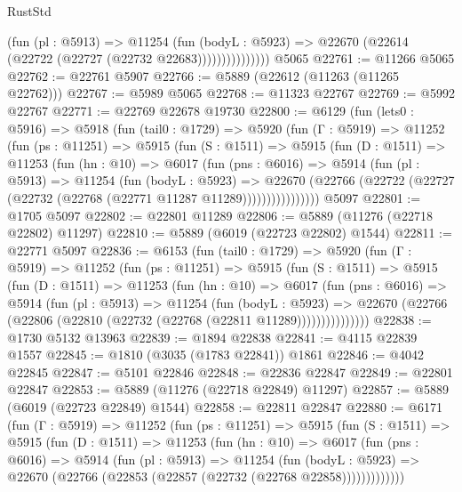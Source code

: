 \begin{lexlean}{RustStd}
\begin{coremodule}
                      (fun (pl : @5913) =>
                      @11254
                        (fun (bodyL : @5923) =>
                        @22670 (@22614 (@22722 (@22727 (@22732 @22683)))))))))))))))
    @5065
@22761 := @11266 @5065
@22762 := @22761 @5907
@22766 := @5889 (@22612 (@11263 (@11265 @22762)))
@22767 := @5989 @5065
@22768 := @11323 @22767
@22769 := @5992 @22767
@22771 := @22769 @22678 @19730
@22800 := @6129
    (fun (lets0 : @5916) =>
    @5918
      (fun (tail0 : @1729) =>
      @5920
        (fun (Γ : @5919) =>
        @11252
          (fun (ps : @11251) =>
          @5915
            (fun (S : @1511) =>
            @5915
              (fun (D : @1511) =>
              @11253
                (fun (hn : @10) =>
                @6017
                  (fun (pns : @6016) =>
                  @5914
                    (fun (pl : @5913) =>
                    @11254
                      (fun (bodyL : @5923) =>
                      @22670
                        (@22766
                          (@22722 (@22727 (@22732 (@22768 (@22771 @11287 @11289))))))))))))))))
    @5097
@22801 := @1705 @5097
@22802 := @22801 @11289
@22806 := @5889 (@11276 (@22718 @22802) @11297)
@22810 := @5889 (@6019 (@22723 @22802) @1544)
@22811 := @22771 @5097
@22836 := @6153
    (fun (tail0 : @1729) =>
    @5920
      (fun (Γ : @5919) =>
      @11252
        (fun (ps : @11251) =>
        @5915
          (fun (S : @1511) =>
          @5915
            (fun (D : @1511) =>
            @11253
              (fun (hn : @10) =>
              @6017
                (fun (pns : @6016) =>
                @5914
                  (fun (pl : @5913) =>
                  @11254
                    (fun (bodyL : @5923) =>
                    @22670 (@22766 (@22806 (@22810 (@22732 (@22768 (@22811 @11289)))))))))))))))
@22838 := @1730 @5132 @13963
@22839 := @1894 @22838
@22841 := @4115 @22839 @1557
@22845 := @1810 (@3035 (@1783 @22841)) @1861
@22846 := @4042 @22845
@22847 := @5101 @22846
@22848 := @22836 @22847
@22849 := @22801 @22847
@22853 := @5889 (@11276 (@22718 @22849) @11297)
@22857 := @5889 (@6019 (@22723 @22849) @1544)
@22858 := @22811 @22847
@22880 := @6171
    (fun (Γ : @5919) =>
    @11252
      (fun (ps : @11251) =>
      @5915
        (fun (S : @1511) =>
        @5915
          (fun (D : @1511) =>
          @11253
            (fun (hn : @10) =>
            @6017
              (fun (pns : @6016) =>
              @5914
                (fun (pl : @5913) =>
                @11254
                  (fun (bodyL : @5923) =>
                  @22670 (@22766 (@22853 (@22857 (@22732 (@22768 @22858)))))))))))))

\end{coremodule}
\end{lexlean}
